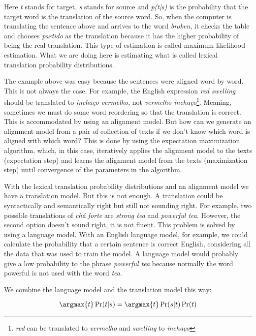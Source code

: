 Here \textit{t} stands for target, \textit{s} stands for source and \textit{p(t|s)} is the probability that the target word is the translation of the source word. So, when the computer is translating the sentence above and arrives to the word \textit{broken}, it checks the table and chooses \textit{partido} as the translation because it has the higher probability of being the real translation. This type of estimation is called maximum likelihood estimation. What we are doing here is estimating what is called lexical translation probability distributions.

The example above was easy because the sentences were aligned word by word. This is not always the case. For example, the English expression \textit{red swelling} should be translated to \textit{inchaço vermelho}, not \textit{vermelho inchaço}\footnote{\textit{red} can be translated to \textit{vermelho} and \textit{swelling} to \textit{inchaço}}. Meaning, sometimes we must do some word reordering so that the translation is correct. This is accommodated by using an alignment model. But how can we generate an alignment model from a pair of collection of texts if we don't know which word is aligned with which word? This is done by using the expectation maximization algorithm, which, in this case, iteratively applies the alignment model to the texts (expectation step) and learns the alignment model from the texts (maximization step) until convergence of the parameters in the algorithm.

With the lexical translation probability distributions and an alignment model we have a translation model. But this is not enough. A translation could be syntactically and semantically right but still not sounding right. For example, two possible translations of \textit{chá forte} are \textit{strong tea} and \textit{powerful tea}. However, the second option doesn't sound right, it is not fluent. This problem is solved by using a language model. With an English language model, for example, we could calculate the probability that a certain sentence is correct English, considering all the data that was used to train the model. A language model would probably give a low probability to the phrase \textit{powerful tea} because normally the word powerful is not used with the word \textit{tea}.

We combine the language model and the translation model this way:

\begin{equation}
\argmax{t} \Pr(t|s) = \argmax{t} \Pr(s|t) \Pr(t)
\end{equation}



